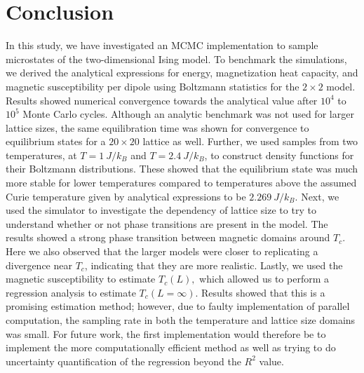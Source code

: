 \documentclass[../main_proj4_correct_template.tex]{subfiles}
\begin{document}
\section{Conclusion}\label{sec:conclusion}


In this study, we have investigated an MCMC implementation to sample microstates of the two-dimensional Ising model. To benchmark the simulations, we derived the analytical expressions for energy, magnetization heat capacity, and magnetic susceptibility per dipole using Boltzmann statistics for the $2\times 2$ model. Results showed numerical convergence towards the analytical value after $10^{4}$ to $10^{5}$ Monte Carlo cycles. Although an analytic benchmark was not used for larger lattice sizes, the same equilibration time was shown for convergence to equilibrium states for a $20 \times 20$ lattice as well. Further, we used samples from two temperatures, at $T=1~J/k_B$ and $T=2.4~J/k_B$, to construct density functions for their Boltzmann distributions. These showed that the equilibrium state was much more stable for lower temperatures compared to temperatures above the assumed Curie temperature given by analytical expressions to be $2.269~J/k_B$. Next, we used the simulator to investigate the dependency of lattice size to try to understand whether or not phase transitions are present in the model. The results showed a strong phase transition between magnetic domains around $T_c$. Here we also observed that the larger models were closer to replicating a divergence near $T_c$, indicating that they are more realistic. Lastly, we used the magnetic susceptibility to estimate $T_c(L),$ which allowed us to perform a regression analysis to estimate $T_c(L=\infty)$. Results showed that this is a promising estimation method; however, due to faulty implementation of parallel computation, the sampling rate in both the temperature and lattice size domains was small. For future work, the first implementation would therefore be to implement the more computationally efficient method as well as trying to do uncertainty quantification of the regression beyond the $R^{2}$ value.
\end{document}

